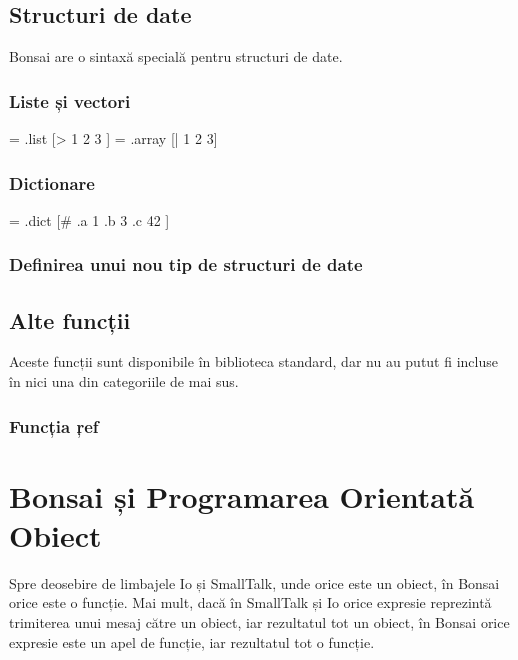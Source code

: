 \documentclass[12pt,a4paper]{memoir}
\begin{document}
\section{Structuri de date}

Bonsai are o sintaxă specială pentru structuri de date.

\subsection{Liste și vectori}

\begin{code}
= .list [> 1 2 3 ]
= .array [| 1 2 3]
\end{code}

\subsection{Dictionare}

\begin{code}
= .dict [# 
  .a 1 
  .b 3
  .c 42 
]
\end{code}

\subsection{Definirea unui nou tip de structuri de date}


\section{Alte funcții}

Aceste funcții sunt disponibile în biblioteca standard, dar nu au putut fi incluse în nici una din categoriile de mai sus.

\subsection{Funcția \c{ref}}


\chapter{Bonsai și Programarea Orientată Obiect}

Spre deosebire de limbajele Io\cite{io} și SmallTalk\cite{smalltalk}, unde orice este un obiect, în Bonsai orice este o funcție. Mai mult, dacă în SmallTalk și Io orice expresie reprezintă trimiterea unui mesaj către un obiect, iar rezultatul tot un obiect, în Bonsai orice expresie este un apel de funcție, iar rezultatul tot o funcție.
\end{document}
